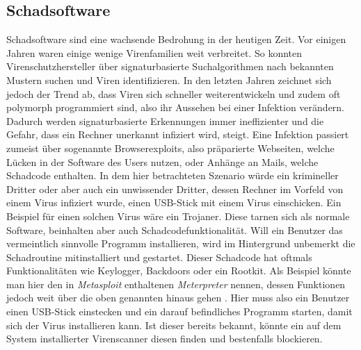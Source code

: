 \subsection{Schadsoftware}
Schadsoftware sind eine wachsende Bedrohung in der heutigen Zeit. Vor einigen Jahren waren einige wenige Virenfamilien weit verbreitet. So konnten Virenschutzhersteller über signaturbasierte Suchalgorithmen nach bekannten Mustern suchen und Viren identifizieren. In den letzten Jahren zeichnet sich jedoch der Trend ab, dass Viren sich schneller weiterentwickeln und zudem oft polymorph programmiert sind, also ihr Aussehen bei einer Infektion verändern. Dadurch werden signaturbasierte Erkennungen immer ineffizienter und die Gefahr, dass ein Rechner unerkannt infiziert wird, steigt. Eine Infektion passiert zumeist über sogenannte Browserexploits, also präparierte Webseiten, welche Lücken in der Software des Users nutzen, oder Anhänge an Mails, welche Schadcode enthalten. In dem hier betrachteten Szenario würde ein krimineller Dritter oder aber auch ein unwissender Dritter, dessen Rechner im Vorfeld von einem Virus infiziert wurde, einen USB-Stick mit einem Virus einschicken. Ein Beispiel für einen solchen Virus wäre ein Trojaner. Diese tarnen sich als normale Software, beinhalten aber auch Schadcodefunktionalität. \cite{Stamp2006} Will ein Benutzer das vermeintlich sinnvolle Programm installieren, wird im Hintergrund unbemerkt die Schadroutine mitinstalliert und gestartet. Dieser Schadcode hat oftmals Funktionalitäten wie Keylogger, Backdoors oder ein Rootkit. Als Beispiel könnte man hier den in \textit{Metasploit}\cite{Metasploit} enthaltenen \textit{Meterpreter} nennen, dessen Funktionen jedoch weit über die oben genannten hinaus gehen \cite{Meterpreter}. Hier muss also ein Benutzer einen USB-Stick einstecken und ein darauf befindliches Programm starten, damit sich der Virus installieren kann. Ist dieser bereits bekannt, könnte ein auf dem System installierter Virenscanner diesen finden und bestenfalls blockieren.
			

